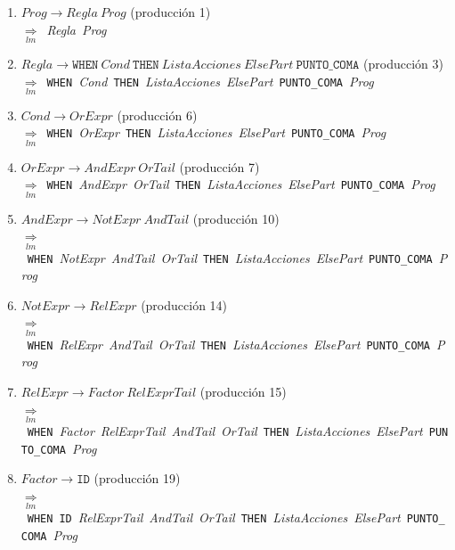 \documentclass[12pt,a4paper]{article}
\begin{document}
{\small\sloppy
\begin{enumerate}[leftmargin=1.2cm, itemsep=3pt]
\item $\mathit{Prog} \to \mathit{Regla}\ \mathit{Prog}$ (producción 1)\\
$\underset{lm}{\Rightarrow}$\ \textit{Regla}\ \textit{Prog}
\item $\mathit{Regla} \to \mathtt{WHEN}\ \mathit{Cond}\ \mathtt{THEN}\ \mathit{ListaAcciones}\ \mathit{ElsePart}\ \mathtt{PUNTO\_COMA}$ (producción 3)\\
$\underset{lm}{\Rightarrow}$\ \texttt{WHEN}\ \textit{Cond}\ \texttt{THEN}\ \textit{ListaAcciones}\ \textit{ElsePart}\ \texttt{PUNTO\_COMA}\ \textit{Prog}
\item $\mathit{Cond} \to \mathit{OrExpr}$ (producción 6)\\
$\underset{lm}{\Rightarrow}$\ \texttt{WHEN}\ \textit{OrExpr}\ \texttt{THEN}\ \textit{ListaAcciones}\ \textit{ElsePart}\ \texttt{PUNTO\_COMA}\ \textit{Prog}
\item $\mathit{OrExpr} \to \mathit{AndExpr}\ \mathit{OrTail}$ (producción 7)\\
$\underset{lm}{\Rightarrow}$\ \texttt{WHEN}\ \textit{AndExpr}\ \textit{OrTail}\ \texttt{THEN}\ \textit{ListaAcciones}\ \textit{ElsePart}\ \texttt{PUNTO\_COMA}\ \textit{Prog}
\item $\mathit{AndExpr} \to \mathit{NotExpr}\ \mathit{AndTail}$ (producción 10)\\
$\underset{lm}{\Rightarrow}$\ \texttt{WHEN}\ \textit{NotExpr}\ \textit{AndTail}\ \textit{OrTail}\ \texttt{THEN}\ \textit{ListaAcciones}\ \textit{ElsePart}\ \texttt{PUNTO\_COMA}\ \textit{Prog}
\item $\mathit{NotExpr} \to \mathit{RelExpr}$ (producción 14)\\
$\underset{lm}{\Rightarrow}$\ \texttt{WHEN}\ \textit{RelExpr}\ \textit{AndTail}\ \textit{OrTail}\ \texttt{THEN}\ \textit{ListaAcciones}\ \textit{ElsePart}\ \texttt{PUNTO\_COMA}\ \textit{Prog}
\item $\mathit{RelExpr} \to \mathit{Factor}\ \mathit{RelExprTail}$ (producción 15)\\
$\underset{lm}{\Rightarrow}$\ \texttt{WHEN}\ \textit{Factor}\ \textit{RelExprTail}\ \textit{AndTail}\ \textit{OrTail}\ \texttt{THEN}\ \textit{ListaAcciones}\ \textit{ElsePart}\ \texttt{PUNTO\_COMA}\ \textit{Prog}
\item $\mathit{Factor} \to \mathtt{ID}$ (producción 19)\\
$\underset{lm}{\Rightarrow}$\ \texttt{WHEN}\ \texttt{ID}\ \textit{RelExprTail}\ \textit{AndTail}\ \textit{OrTail}\ \texttt{THEN}\ \textit{ListaAcciones}\ \textit{ElsePart}\ \texttt{PUNTO\_COMA}\ \textit{Prog}

\end{enumerate}}
\end{document}

